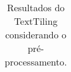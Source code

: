 \begin{table}[!h]
\begin{tabular}{|c|c||c|c|c|c|c||c|c|c|c|c|}
 \end{tabular}  
 \label{tab:resultadosTT}
\caption{Resultados do TextTiling considerando o pré-processamento.}
\end{table} 


























